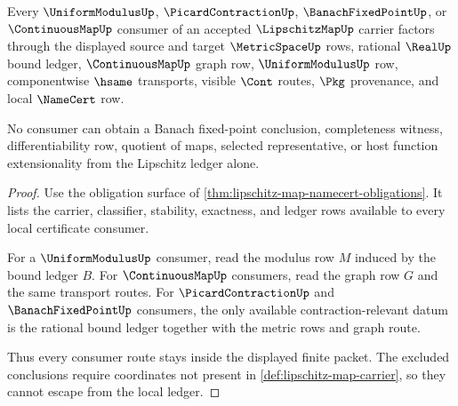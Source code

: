 \begin{theorem}
\label{thm:lipschitz-map-ledger-nonescape}
Every $\UniformModulusUp$, $\PicardContractionUp$, $\BanachFixedPointUp$, or
$\ContinuousMapUp$ consumer of an accepted $\LipschitzMapUp$ carrier factors
through the displayed source and target $\MetricSpaceUp$ rows, rational
$\RealUp$ bound ledger, $\ContinuousMapUp$ graph row, $\UniformModulusUp$ row,
componentwise $\hsame$ transports, visible $\Cont$ routes, $\Pkg$ provenance,
and local $\NameCert$ row.

No consumer can obtain a Banach fixed-point conclusion, completeness witness,
differentiability row, quotient of maps, selected representative, or host
function extensionality from the Lipschitz ledger alone.
\end{theorem}
\begin{proof}
Use the obligation surface of
\autoref{thm:lipschitz-map-namecert-obligations}. It lists the carrier,
classifier, stability, exactness, and ledger rows available to every local
certificate consumer.

For a $\UniformModulusUp$ consumer, read the modulus row $M$ induced by the
bound ledger $B$. For $\ContinuousMapUp$ consumers, read the graph row $G$ and
the same transport routes. For $\PicardContractionUp$ and
$\BanachFixedPointUp$ consumers, the only available contraction-relevant datum
is the rational bound ledger together with the metric rows and graph route.

Thus every consumer route stays inside the displayed finite packet. The
excluded conclusions require coordinates not present in
\autoref{def:lipschitz-map-carrier}, so they cannot escape from the local
ledger.
\end{proof}

